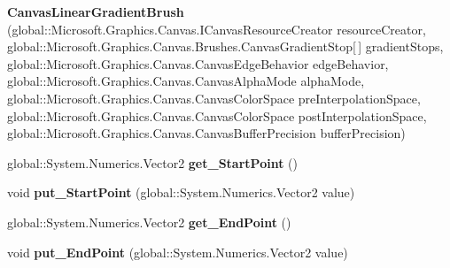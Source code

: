 \begin{DoxyCompactItemize}
\item 
\mbox{\label{class_microsoft_1_1_graphics_1_1_canvas_1_1_brushes_1_1_canvas_linear_gradient_brush_a5fbbd2cc60fa7f11f4ce627c5a243729}} 
{\bfseries Canvas\+Linear\+Gradient\+Brush} (global\+::\+Microsoft.\+Graphics.\+Canvas.\+I\+Canvas\+Resource\+Creator resource\+Creator, global\+::\+Microsoft.\+Graphics.\+Canvas.\+Brushes.\+Canvas\+Gradient\+Stop\mbox{[}$\,$\mbox{]} gradient\+Stops, global\+::\+Microsoft.\+Graphics.\+Canvas.\+Canvas\+Edge\+Behavior edge\+Behavior, global\+::\+Microsoft.\+Graphics.\+Canvas.\+Canvas\+Alpha\+Mode alpha\+Mode, global\+::\+Microsoft.\+Graphics.\+Canvas.\+Canvas\+Color\+Space pre\+Interpolation\+Space, global\+::\+Microsoft.\+Graphics.\+Canvas.\+Canvas\+Color\+Space post\+Interpolation\+Space, global\+::\+Microsoft.\+Graphics.\+Canvas.\+Canvas\+Buffer\+Precision buffer\+Precision)
\item 
\mbox{\label{class_microsoft_1_1_graphics_1_1_canvas_1_1_brushes_1_1_canvas_linear_gradient_brush_a2f1dcd8bc06e236375c0c79b270e53aa}} 
global\+::\+System.\+Numerics.\+Vector2 {\bfseries get\+\_\+\+Start\+Point} ()
\item 
\mbox{\label{class_microsoft_1_1_graphics_1_1_canvas_1_1_brushes_1_1_canvas_linear_gradient_brush_a52511f8d765c33e4e283bfbff7fe36b8}} 
void {\bfseries put\+\_\+\+Start\+Point} (global\+::\+System.\+Numerics.\+Vector2 value)
\item 
\mbox{\label{class_microsoft_1_1_graphics_1_1_canvas_1_1_brushes_1_1_canvas_linear_gradient_brush_ac3c3a6cf19b847fe48af885a0e9afc69}} 
global\+::\+System.\+Numerics.\+Vector2 {\bfseries get\+\_\+\+End\+Point} ()
\item 
\mbox{\label{class_microsoft_1_1_graphics_1_1_canvas_1_1_brushes_1_1_canvas_linear_gradient_brush_a62c42f4087bf4d9485a3a063483256a4}} 
void {\bfseries put\+\_\+\+End\+Point} (global\+::\+System.\+Numerics.\+Vector2 value)
\item 

\end{DoxyCompactItemize}
